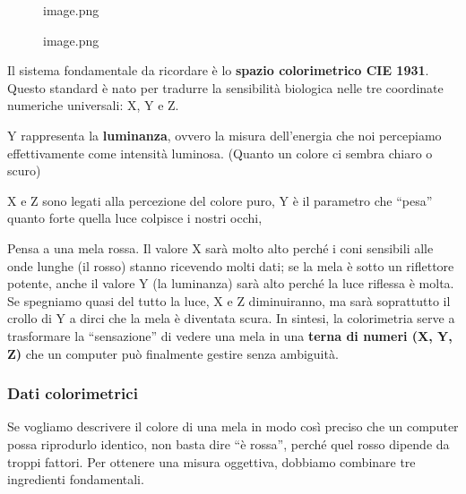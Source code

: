\documentclass[
]{article}
\begin{document}
\begin{figure}
\centering
{image.png}
\caption{image.png}
\end{figure}

Il sistema fondamentale da ricordare è lo \textbf{spazio colorimetrico CIE 1931}. Questo standard è nato per tradurre la sensibilità biologica nelle tre coordinate numeriche universali: X, Y e Z.

Y rappresenta la \textbf{luminanza}, ovvero la misura dell'energia che noi percepiamo effettivamente come intensità luminosa. (Quanto un colore ci sembra chiaro o scuro)

X e Z sono legati alla percezione del colore puro, Y è il parametro che ``pesa'' quanto forte quella luce colpisce i nostri occhi,

Pensa a una mela rossa. Il valore X sarà molto alto perché i coni sensibili alle onde lunghe (il rosso) stanno ricevendo molti dati; se la mela è sotto un riflettore potente, anche il valore Y (la luminanza) sarà alto perché la luce riflessa è molta. Se spegniamo quasi del tutto la luce, X e Z diminuiranno, ma sarà soprattutto il crollo di Y a dirci che la mela è diventata scura. In sintesi, la colorimetria serve a trasformare la ``sensazione'' di vedere una mela in una \textbf{terna di numeri (X, Y, Z)} che un computer può finalmente gestire senza ambiguità.

\hypertarget{dati-colorimetrici}{%
\subsubsection{Dati colorimetrici}\label{dati-colorimetrici}}

Se vogliamo descrivere il colore di una mela in modo così preciso che un computer possa riprodurlo identico, non basta dire ``è rossa'', perché quel rosso dipende da troppi fattori. Per ottenere una misura oggettiva, dobbiamo combinare tre ingredienti fondamentali.
\end{document}
